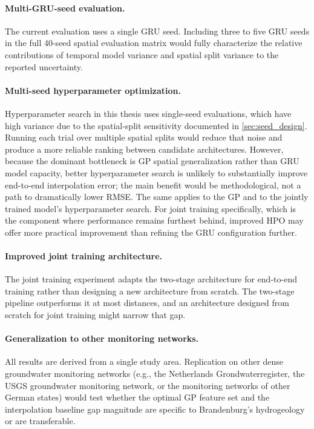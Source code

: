\paragraph{Multi-GRU-seed evaluation.}
The current evaluation uses a single GRU seed. Including three to five GRU seeds in the full
40-seed spatial evaluation matrix would fully characterize the relative contributions of
temporal model variance and spatial split variance to the reported uncertainty.

\paragraph{Multi-seed hyperparameter optimization.}
Hyperparameter search in this thesis uses single-seed evaluations, which have high variance due to the spatial-split sensitivity documented in \cref{sec:seed_design}. Running each trial over multiple spatial splits would reduce that noise and produce a more reliable ranking between candidate architectures. However, because the dominant bottleneck is GP spatial generalization rather than GRU model capacity, better hyperparameter search is unlikely to substantially improve end-to-end interpolation error; the main benefit would be methodological, not a path to dramatically lower RMSE. The same applies to the GP and to the jointly trained model's hyperparameter search. For joint training specifically, which is the component where performance remains furthest behind, improved HPO may offer more practical improvement than refining the GRU configuration further.

\paragraph{Improved joint training architecture.}
The joint training experiment adapts the two-stage architecture for end-to-end training rather than designing a new architecture from scratch. The two-stage pipeline outperforms it at most distances, and an architecture designed from scratch for joint training might narrow that gap.

\paragraph{Generalization to other monitoring networks.}
All results are derived from a single study area. Replication on other dense groundwater
monitoring networks (e.g., the Netherlands Grondwaterregister, the USGS groundwater
monitoring network, or the monitoring networks of other German states) would test whether the optimal GP feature set and the interpolation baseline gap magnitude
are specific to Brandenburg's hydrogeology or are transferable.

